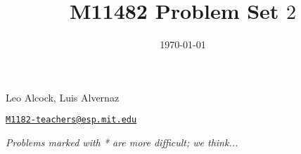 \documentclass[12pt]{amsart}
\title{M11482 Problem Set $2$}%
\date{\today}
\theoremstyle{definition}
\theoremstyle{remark}
\begin{document}
\maketitle

\vspace*{-0.25in}
\centerline{Leo Alcock, Luis Alvernaz}
\centerline{\href{mailto:M11482-teachers@esp.mit.edu}{{\tt M1182-teachers@esp.mit.edu}}}
\vspace*{0.15in}
\centerline{{\it Problems marked with * are more difficult; we think...}}
\vspace*{0.25in}

\medskip



\medskip

\end{document}
